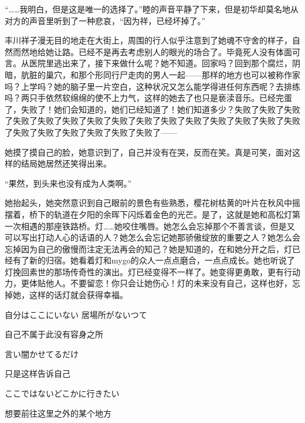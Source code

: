 \documentclass{article}
\begin{document}
“……我明白，但是这是唯一的选择了。”睦的声音平静了下来，但是初华却莫名地从对方的声音里听到了一种悲哀，“因为祥，已经坏掉了。”



\newpage



丰川祥子漫无目的地走在大街上，周围的行人似乎注意到了她魂不守舍的样子，自然而然地给她让路。已经不是再去考虑别人的眼光的场合了。毕竟死人没有体面可言。从医院里逃出来了，接下来做什么呢？她不知道。回家吗？回到那个腐烂，阴暗，肮脏的巢穴，和那个形同行尸走肉的男人一起——那样的地方也可以被称作家吗？上学吗？她的脑子里一片空白，这种状况又怎么能学得进任何东西呢？去排练吗？两只手依然软绵绵的使不上力气，这样的她去了也只是亵渎音乐。已经完蛋了，失败了！她们会知道的，她们已经知道了！她们知道多少？失败了失败了失败了失败了失败了失败了失败了失败了失败了失败了失败了失败了失败了失败了失败了失败了失败了失败了失败了失败了失败了——



她摸了摸自己的脸，她意识到了，自己并没有在哭，反而在笑。真是可笑，面对这样的结局她居然还笑得出来。



“果然，到头来也没有成为人类啊。”



她抬起头，她突然意识到自己眼前的景色有些熟悉，樱花树枯黄的叶片在秋风中摇摆着，桥下的轨道在夕阳的余晖下闪烁着金色的光芒。是了，这就是她和高松灯第一次相遇的那座铁路桥。灯……她咬住嘴唇。她怎么会忘掉那个不善言谈，但是又可以写出打动人心的话语的人？她怎么会忘记她那骄傲绽放的重要之人？她怎么会忘掉因为自己的傲慢而注定无法再会的知己？她是知道的，在和她分开之后，灯已经有了新的归宿。她看着灯和mygo的众人一点点磨合，一点点成长。她也听说了灯挽回素世的那场传奇性的演出。灯已经变得不一样了。她变得更勇敢，更有行动力，更体贴他人。不要留恋！你只会让她伤心！灯的未来没有自己，这样也好，忘掉她，这样的话灯就会获得幸福。



自分はここにいない 居場所がないつて



自己不属于此没有容身之所



言い闇かせてるだけ



只是这样告诉自己



ここではないどこかに行きたい



想要前往这里之外的某个地方
\end{document}
